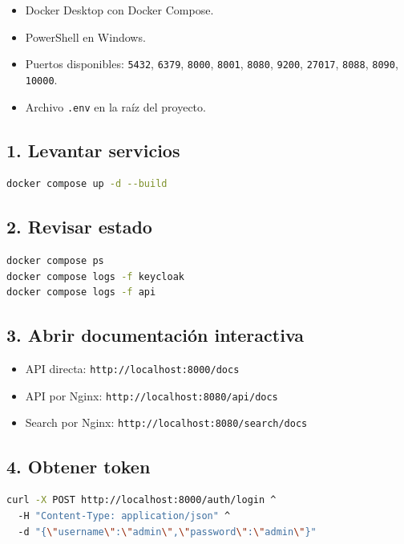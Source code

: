 \documentclass[12pt,letterpaper]{article}
\def\codefile#1{\nolinkurl{#1}}
\begin{document}
\begin{itemize}
    \item Docker Desktop con Docker Compose.
    \item PowerShell en Windows.
    \item Puertos disponibles: \codefile{5432}, \codefile{6379}, \codefile{8000}, \codefile{8001}, \codefile{8080}, \codefile{9200}, \codefile{27017}, \codefile{8088}, \codefile{8090}, \codefile{10000}.
    \item Archivo \codefile{.env} en la raíz del proyecto.
\end{itemize}

\subsection{1. Levantar servicios}

\begin{lstlisting}[language=bash]
docker compose up -d --build
\end{lstlisting}

\subsection{2. Revisar estado}

\begin{lstlisting}[language=bash]
docker compose ps
docker compose logs -f keycloak
docker compose logs -f api
\end{lstlisting}

\subsection{3. Abrir documentación interactiva}

\begin{itemize}
    \item API directa: \codefile{http://localhost:8000/docs}
    \item API por Nginx: \codefile{http://localhost:8080/api/docs}
    \item Search por Nginx: \codefile{http://localhost:8080/search/docs}
\end{itemize}

\subsection{4. Obtener token}

\begin{lstlisting}[language=bash]
curl -X POST http://localhost:8000/auth/login ^
  -H "Content-Type: application/json" ^
  -d "{\"username\":\"admin\",\"password\":\"admin\"}"
\end{lstlisting}
\end{document}
